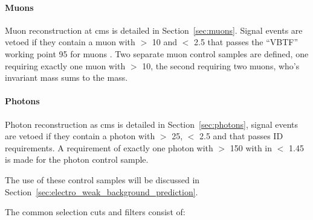 \paragraph{Muons} %
\label{par:muons}
Muon reconstruction at \ac{cms} is detailed in Section~\ref{sec:muons}. Signal 
events are vetoed if they contain a muon with \PT $>$ \unit{10}{\GeV} and \mETA 
$<$ 2.5 that passes the ``VBTF'' working point 95 for muons 
\cite{PAS-MUO-10-002}. Two separate muon control samples are defined, one 
requiring exactly one muon with \PT $>$ \unit{10}{\GeV}, the second requiring 
two muons, who's invariant mass sums to the \PZ mass. 


\paragraph{Photons} %
\label{par:photons}
Photon reconstruction as \ac{cms} is detailed in Section~\ref{sec:photons}, 
signal events are vetoed if they contain a photon with \ET $>$ \unit{25}{\GeV}, 
\mETA $<$ 2.5 and that passes ID requirements\cite{PAS-EGM-10-006}. A 
requirement of exactly one photon with \ET $>$ \unit{150}{\GeV} with in \mETA 
$<$ 1.45 is made for the photon control sample.



The use of these control samples will be discussed in Section~\ref{sec:electro_weak_background_prediction}. 

The common selection cuts and filters consist of:

